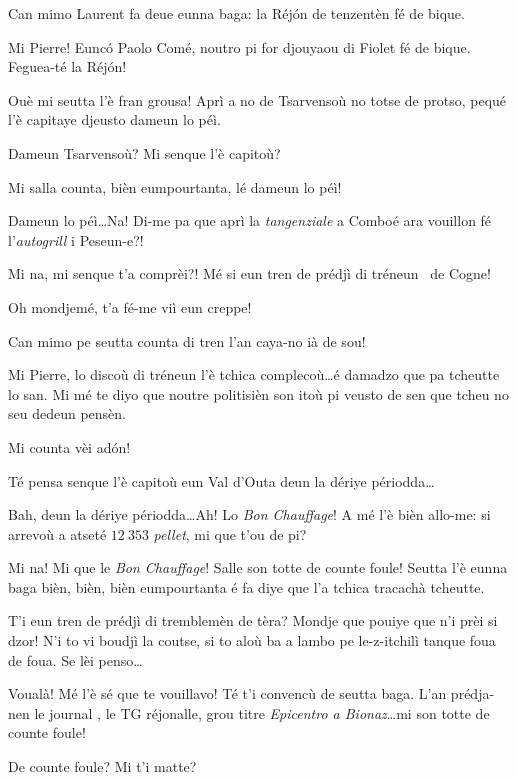 \begin{drama}
\Pierrespeaks Can mimo Laurent fa deue eunna baga: la Réj\'on de tenzentèn fé de bique.

\Laurentspeaks Mi Pierre! Eunc\'o Paolo Comé, noutro pi for djou\-yaou di Fiolet fé de bique. Feguea-té la Réj\'on!

\Pierrespeaks Ouè mi seutta l'è fran grousa! Aprì a no de Tsarvensoù no totse de protso, pequé l'è capitaye djeusto dameun lo péì.

\Laurentspeaks Dameun Tsarvensoù? Mi senque l'è capitoù?

\Pierrespeaks Mi salla counta, bièn eumpourtanta, lé dameun lo péì!

\Laurentspeaks Dameun lo péì\ldots Na! Di-me pa que aprì la \textit{tangenziale} a Comboé ara vouillon fé l'\textit{autogrill} i Peseun-e?!

\Pierrespeaks Mi na, mi senque t'a comprèi?! Mé si eun tren de prédjì di tréneun \tren\ de Cogne!

\Laurentspeaks Oh mondjemé, t'a fé-me viì eun creppe!

\Pierrespeaks Can mimo pe seutta counta di tren l'an caya-no ià de sou! 

\Laurentspeaks Mi Pierre, lo discoù di tréneun l'è tchica complecoù\ldots é damadzo que pa tcheutte lo san. Mi mé te diyo que noutre politisièn son itoù pi veusto de sen que tcheu no seu dedeun pensèn.

\Pierrespeaks Mi counta vèi ad\'on!

\Laurentspeaks Té pensa senque l'è capitoù eun Val d'Outa deun la dériye périodda\ldots

\Pierrespeaks Bah, deun la dériye périodda\ldots Ah! Lo \textit{Bon Chauffage}! A mé l'è bièn allo-me: si arrevoù a atseté $12\ 353$ \textit{pellet}, mi que t'ou de pi?

\Laurentspeaks Mi na! Mi que le \textit{Bon Chauffage}! Salle son totte de counte foule! Seutta l'è eunna baga bièn, bièn, bièn eumpourtanta é fa diye que l'a tchica tracachà tcheutte.

\Pierrespeaks T'i eun tren de prédjì di tremblemèn de tèra? Mondje que pouiye que n'i prèi si dzor! N'i to vi boudjì la coutse, si to aloù ba a lambo pe le-z-itchilì tanque foua de foua. Se lèi penso\ldots

\Laurentspeaks Voualà! Mé l'è sé que te vouillavo! Té t'i convencù de seutta baga. L'an prédja-nen le journal \journal , le TG réjonalle, grou titre \og \textit{Epicentro a Bionaz}\fg\ldots mi son totte de counte foule!

\Pierrespeaks De counte foule? Mi t'i matte?


\end{drama}
